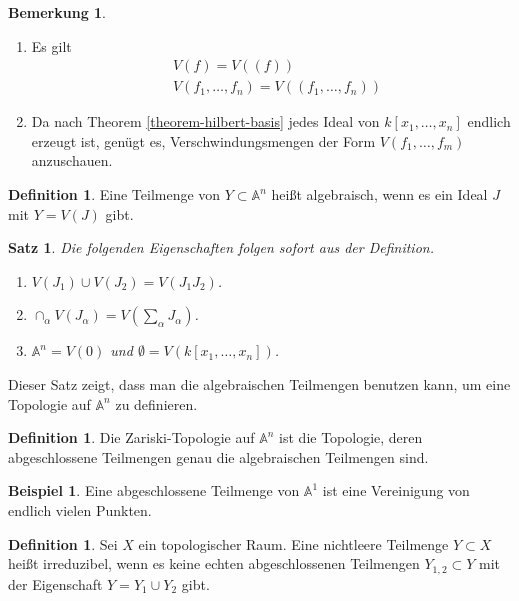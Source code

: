\documentclass[reqno,12pt]{article}
\numberwithin{equation}{section}
\newcommand{\bA}{\mathbb{A}}
\theoremstyle{plain}
\newtheorem{proposition}[thm]{Satz}
\theoremstyle{definition}
\newtheorem{definition}[thm]{Definition}
\newtheorem{example}[thm]{Beispiel}
\newtheorem{remark}[thm]{Bemerkung}
\begin{document}
\begin{remark}
\
\begin{enumerate}
\item Es gilt
\begin{align*}
& V(f) = V((f)) \\
& V(f_1, \dots, f_n) = V((f_1, \dots, f_n))
\end{align*}

\item Da nach Theorem \ref{theorem-hilbert-basis} jedes Ideal von $k[x_1, \dots, x_n]$ endlich erzeugt ist, genügt es, Verschwindungsmengen der Form $V(f_1, \dots , f_m)$ anzuschauen.
\end{enumerate}
\end{remark}

\begin{definition}
Eine Teilmenge von $Y \subset \bA^n$ heißt {\sf algebraisch}, wenn es ein Ideal $J$ mit $Y = V(J)$ gibt.
\end{definition}


\begin{proposition}
Die folgenden Eigenschaften folgen sofort aus der Definition.
\begin{enumerate}
\item $V(J_1) \cup V(J_2) = V(J_1 J_2)$.
\item $\cap_{\alpha} V(J_{\alpha}) = V(\sum_{\alpha} J_{\alpha})$.
\item $\bA^n = V(0)$ und $\emptyset = V(k[x_1, \dots, x_n])$.
\end{enumerate}
\end{proposition}

Dieser Satz zeigt, dass man die algebraischen Teilmengen benutzen kann, um eine Topologie auf $\bA^n$ zu definieren.
\begin{definition}
Die {\sf Zariski-Topologie} auf $\bA^n$ ist die Topologie, deren abgeschlossene Teilmengen genau die algebraischen Teilmengen sind.
\end{definition}

\begin{example}
Eine abgeschlossene Teilmenge von $\bA^1$ ist eine Vereinigung von endlich vielen Punkten.
\end{example}

\begin{definition}
Sei $X$ ein topologischer Raum. Eine nichtleere Teilmenge $Y \subset X$ heißt irreduzibel, wenn es keine echten abgeschlossenen Teilmengen $Y_{1,2} \subset Y$ mit der Eigenschaft $Y = Y_1 \cup Y_2$ gibt.
\end{definition}
\end{document}
